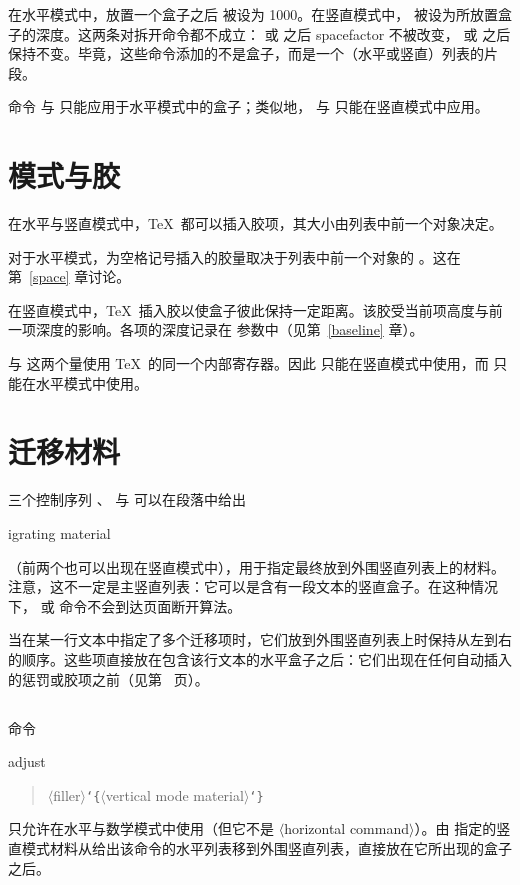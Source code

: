 \documentclass[a4paper]{rapport3}
\makeatletter
\def\lb{{\tt\char`\{}}\def\rb{{\tt\char`\}}}
\def\gr#1{$\langle$#1$\rangle$}\def\key#1{{\tt#1}}
\newenvironment{disp}{\begin{quotation}}{\end{quotation}}
\def\term#1\par{\index{#1}}
\def\cstoidx#1\par{\index{#1@\cs{#1}}}
\makeatother
\begin{document}
在水平模式中，放置一个盒子之后  被设为 1000。在竖直模式中， 被设为所放置盒子的深度。这两条对拆开命令都不成立： 或  之后 spacefactor 不被改变， 或  之后  保持不变。毕竟，这些命令添加的不是盒子，而是一个（水平或竖直）列表的片段。

命令  与  只能应用于水平模式中的盒子；类似地， 与  只能在竖直模式中应用。


\section{模式与胶}

在水平与竖直模式中，\TeX\ 都可以插入胶项，其大小由列表中前一个对象决定。

对于水平模式，为空格记号插入的胶量取决于列表中前一个对象的 。这在第~\ref{space} 章讨论。

在竖直模式中，\TeX\ 插入胶以使盒子彼此保持一定距离。该胶受当前项高度与前一项深度的影响。各项的深度记录在  参数中（见第~\ref{baseline} 章）。

 与  这两个量使用 \TeX\ 的同一个内部寄存器。因此  只能在竖直模式中使用，而  只能在水平模式中使用。

\section{迁移材料}
\label{migrate}

三个控制序列 、 与  可以在段落中给出
\term migrating material\par
（前两个也可以出现在竖直模式中），用于指定最终放到外围竖直列表上的材料。注意，这不一定是主竖直列表：它可以是含有一段文本的竖直盒子。在这种情况下， 或  命令不会到达页面断开算法。

当在某一行文本中指定了多个迁移项时，它们放到外围竖直列表上时保持从左到右的顺序。这些项直接放在包含该行文本的水平盒子之后：它们出现在任何自动插入的惩罚或胶项之前（见第~\pageref{between:lines} 页）。

\subsection{}

命令
\cstoidx vadjust\par
\begin{disp}\gr{filler}\lb\gr{vertical mode material}\rb\end{disp}
\awp
只允许在水平与数学模式中使用（但它不是 \gr{horizontal command}）。由  指定的竖直模式材料从给出该命令的水平列表移到外围竖直列表，直接放在它所出现的盒子之后。
\end{document}
